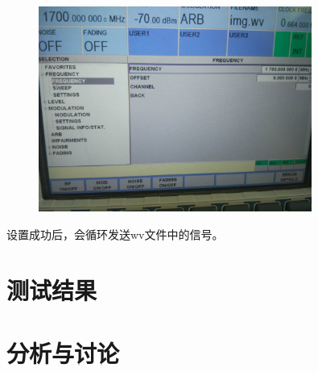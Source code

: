 \documentclass[UTF8]{ctexart}
\begin{document}
\begin{figure}[H]
        \centering
        \includegraphics[width=0.8\textwidth]{images//setfreq.jpg}
\end{figure}

设置成功后，会循环发送wv文件中的信号。

\section{测试结果}

\section{分析与讨论}
\end{document}

